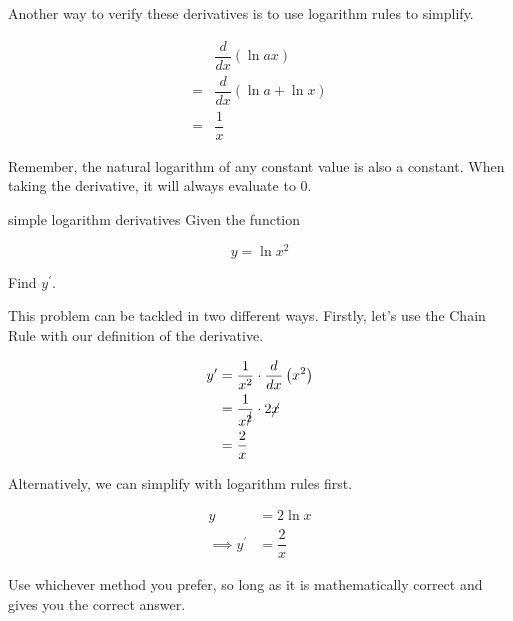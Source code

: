 Another way to verify these derivatives is to use logarithm rules to simplify.

\begin{align}
    &\dfrac{d}{dx} \left( \ln{ax} \right) \\
    = &\dfrac{d}{dx} \left( \ln{a} + \ln{x} \right) \\
    = &\dfrac{1}{x}
\end{align}

\begin{tip}
    Remember, the natural logarithm of any constant value is also a constant. When taking the derivative, it will always evaluate to \( 0 \).
\end{tip}

\begin{example}{simple logarithm derivatives}
    Given the function
    
    \[ y = \ln{x^2} \]
    
    Find \( y^\prime \).
    
    \vspace{0.3cm}
    
    This problem can be tackled in two different ways. Firstly, let's use the Chain Rule with our definition of the derivative.
    
    \begin{align}
        y^\prime &= \dfrac{1}{x^2} \cdot \dfrac{d}{dx} \left( x^2 \right) \\
        &= \dfrac{1}{x^{\cancel{2}}} \cdot 2\cancel{x} \\
        &= \dfrac{2}{x}
    \end{align}
    
    Alternatively, we can simplify with logarithm rules first.
    
    \begin{align}
        y &= 2 \ln{x} \\
        \implies y^\prime &= \dfrac{2}{x}
    \end{align}
    
    Use whichever method you prefer, so long as it is mathematically correct and gives you the correct answer.
\end{example}

